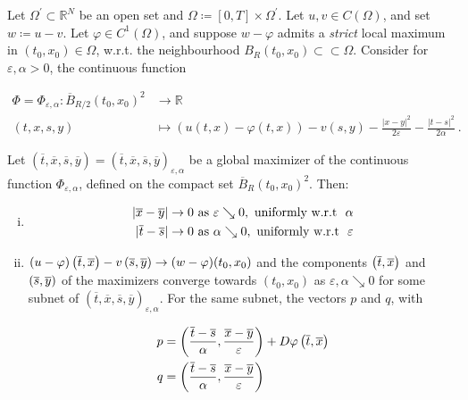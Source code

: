 \begin{lemma}
		 	\label{doubling device}
		 	Let $ \Omega^{\prime} \subset \mathbb{R}^N $ be an open set and $ \Omega \coloneqq \left[0, T\right] \times \Omega^{\prime} $. Let $ u, v \in C(\Omega) $, and set $ w \coloneqq u - v $. 
		 	Let $ \varphi \in C^{1}(\Omega) $, and suppose $ w - \varphi $ admits a \emph{strict} local maximum in $ (t_0, x_0) \in \Omega $, w.r.t. the neighbourhood $ B_R(t_0, x_0) \subset \subset \Omega $. Consider for $ \varepsilon, \alpha > 0 $, the continuous function
		 	
		 	\begin{align*}
		 	\Phi = \Phi_{\varepsilon, \alpha} :\overline{B} _{R / 2}(t_0, x_0)^2 &\to \mathbb{R} \\
		 	(t, x, s, y) &\mapsto (u(t, x) - \varphi(t, x)) - v(s, y) - \frac{\lvert x - y \rvert^2 }{2 \varepsilon} - \frac{\lvert t - s \rvert^2}{2 \alpha} \ .
		 	\end{align*}
		 	
		 	Let $ (\overline{t}, \overline{x}, \overline{s}, \overline{y}) = (\overline{t}, \overline{x}, \overline{s}, \overline{y})_{\varepsilon, \alpha} $ be a global maximizer of the continuous function $ \Phi_{\varepsilon, \alpha} $, defined on the compact set $ \overline{B}_R(t_0, x_0)^2 $. Then:
		 	
		 	\begin{enumerate}[(i)]
		 		\item 
		 		\label{distance convergence}
		 		\begin{align*}
		 		\lvert \overline{x} - \overline{y} \rvert &\to 0 \hbox{ as } \varepsilon \searrow 0, \hbox{ uniformly w.r.t } \  \alpha \\
		 		\lvert \overline{t} - \overline{s} \rvert &\to 0 \hbox{ as } \alpha \searrow 0, \hbox{ uniformly w.r.t } \ \varepsilon 
		 		\end{align*}
		 		
		 		\item
		 		\label{maximizer convergence} 
		 		$ (u - \varphi)\left(\overline{t}, \overline{x}\right) - v\left(\overline{s}, \overline{y}\right) \to (w - \varphi)(t_0, x_0) $ and the components $ \left(\overline{t}, \overline{x}\right) $ and $ \left(\overline{s}, \overline{y}\right) $ of the maximizers converge towards $ (t_0, x_0) $ as $ \varepsilon, \alpha \searrow 0 $ for some subnet of $ (\overline{t}, \overline{x}, \overline{s}, \overline{y})_{\varepsilon, \alpha} $. 
		 		For the same subnet, the vectors $ p $ and $ q $, with
		 		
		 		\begin{align*}
		 			p &= \left( \frac{\overline{t} - \overline{s}}{\alpha}, \frac{\overline{x} - \overline{y}}{\varepsilon} \right) + D\varphi\left(\overline{t}, \overline{x}\right) \\
		 			q &= \left( \frac{\overline{t} - \overline{s}}{\alpha}, \frac{\overline{x} - \overline{y}}{\varepsilon} \right)
		 		\end{align*}
		 		

\end{enumerate}
\end{lemma}
